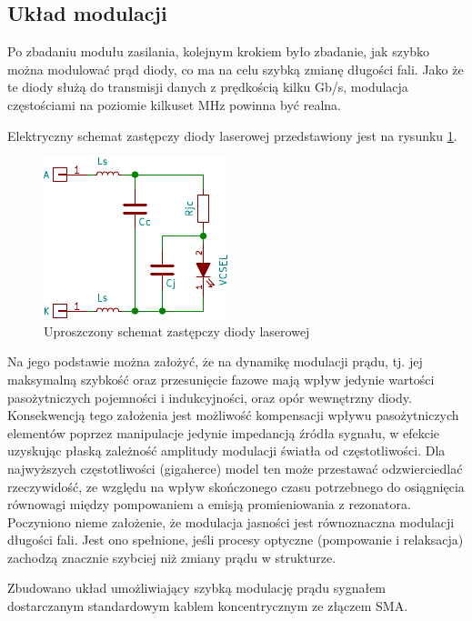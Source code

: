 \documentclass[a4paper,10pt]{article}
\begin{document}
\subsection{Układ modulacji}

Po zbadaniu modułu zasilania, kolejnym krokiem było zbadanie, jak szybko można modulować prąd diody, co ma na celu szybką zmianę długości fali. Jako że te diody służą do transmisji danych z prędkością kilku Gb/s, modulacja częstościami na poziomie kilkuset MHz powinna być realna. 

Elektryczny schemat zastępczy diody laserowej przedstawiony jest na rysunku \ref{sch-mod1}. 
\begin{figure}
\begin{center}
 \includegraphics{./obrazki/sch_mod1.pdf}
\end{center}
\caption{Uproszczony schemat zastępczy diody laserowej}
\label{sch-mod1}
\end{figure}
Na jego podstawie można założyć, że na dynamikę modulacji prądu, tj. jej maksymalną szybkość oraz przesunięcie fazowe mają wpływ jedynie wartości pasożytniczych pojemności i indukcyjności, oraz opór wewnętrzny diody. Konsekwencją tego założenia jest możliwość kompensacji wpływu pasożytniczych elementów poprzez manipulacje jedynie impedancją źródła sygnału, w efekcie uzyskując płaską zależność amplitudy modulacji światła od częstotliwości.
Dla najwyższych częstotliwości (gigaherce) model ten może przestawać odzwierciedlać rzeczywidość, ze względu na wpływ skończonego czasu potrzebnego do osiągnięcia równowagi między pompowaniem a emisją promieniowania z rezonatora. Poczyniono nieme założenie, że modulacja jasności jest równoznaczna modulacji długości fali. Jest ono spełnione, jeśli procesy optyczne (pompowanie i relaksacja) zachodzą znacznie szybciej niż zmiany prądu w strukturze.

Zbudowano układ umożliwiający szybką modulację prądu sygnałem dostarczanym standardowym kablem koncentrycznym ze złączem SMA.
\end{document}

